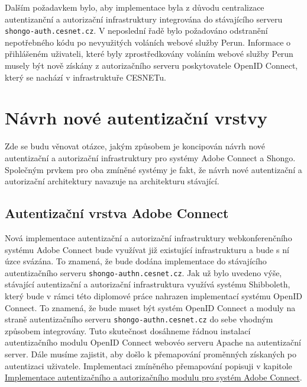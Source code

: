 \documentclass[
  printed, %
  twoside, %
  table,   %
  nolof,     %
  nolot,     %
]{fithesis3}
\begin{document}
Dalším požadavkem bylo, aby implementace byla z důvodu centralizace autentizanční a autorizační infrastruktury integrována do stávajícího serveru \texttt{shongo-auth.cesnet.cz}. V neposlední řadě bylo požadováno odstranění nepotřebného kódu po nevyužitých voláních webové služby Perun. Informace o přihlášeném uživateli, které byly zprostředkovány voláním webové služby Perun musely být nově získány z autorizačního serveru poskytovatele OpenID Connect, který se nachází v infrastruktuře CESNETu.     


\section{Návrh nové autentizační vrstvy}
Zde se budu věnovat otázce, jakým způsobem je koncipován návrh nové autentizační a autorizační infrastruktury pro systémy Adobe Connect a Shongo. Společným prvkem pro oba zmíněné systémy je fakt, že návrh nové autentizační a autorizační architektury navazuje na architekturu stávající. 

\subsection{Autentizační vrstva Adobe Connect}
Nová implementace autentizační a autorizační infrastruktury webkonferenčního systému Adobe Connect bude využívat již existující infrastrukturu a bude s ní úzce svázána. To znamená, že bude dodána implementace do stávajícího autentizačního serveru \texttt{shongo-authn.cesnet.cz}. Jak už bylo uvedeno výše, stávající autentizační a autorizační infrastruktura využívá systému Shibboleth, který bude v rámci této diplomové práce nahrazen implementací systému OpenID Connect. To znamená, že bude muset být systém OpenID Connect a moduly na straně autentizačního serveru \texttt{shongo-authn.cesnet.cz} do sebe vhodným způsobem integrovány. Tuto skutečnost dosáhneme řádnou instalací autentizačního modulu OpenID Connect webovéo serveru Apache na autentizační server. Dále musíme zajistit, aby došlo k přemapování proměnných získaných po autentizaci uživatele. Implementaci zmíněného přemapování popisuji v kapitole \hyperref[ACImpl]{Implementace autentizačního a autorizačního modulu pro systém Adobe Connect}. 
\end{document}
